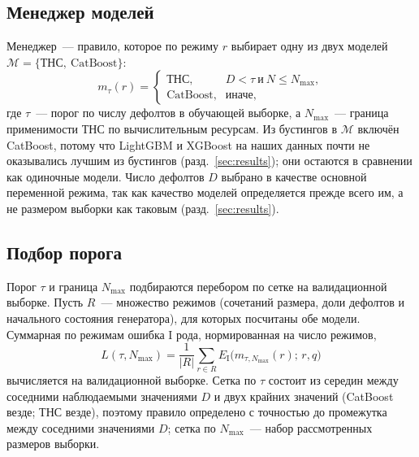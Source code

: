 \documentclass{misisarticle}
\begin{document}
\subsection{Менеджер моделей}

Менеджер~--- правило, которое по режиму $r$ выбирает одну из двух моделей $\mathcal M=\{\text{ТНС},\ \text{CatBoost}\}$:
\begin{equation}
m_\tau(r)=\begin{cases}
\text{ТНС}, & D<\tau\ \text{и}\ N\le N_{\max},\\
\text{CatBoost}, & \text{иначе,}
\end{cases}
\end{equation}
где $\tau$~--- порог по числу дефолтов в обучающей выборке, а $N_{\max}$~--- граница применимости ТНС по вычислительным ресурсам. Из бустингов в $\mathcal M$ включён CatBoost, потому что LightGBM и XGBoost на наших данных почти не оказывались лучшим из бустингов (разд.~\ref{sec:results}); они остаются в сравнении как одиночные модели. Число дефолтов $D$ выбрано в качестве основной переменной режима, так как качество моделей определяется прежде всего им, а не размером выборки как таковым (разд.~\ref{sec:results}).

\subsection{Подбор порога}

Порог $\tau$ и граница $N_{\max}$ подбираются перебором по сетке на валидационной выборке. Пусть $R$~--- множество режимов (сочетаний размера, доли дефолтов и начального состояния генератора), для которых посчитаны обе модели. Суммарная по режимам ошибка I рода, нормированная на число режимов,
\begin{equation}
\label{eq:L}
L(\tau,N_{\max})=\frac{1}{|R|}\sum_{r\in R}E_{\mathrm{I}}\bigl(m_{\tau,N_{\max}}(r);\,r,q\bigr)
\end{equation}
вычисляется на валидационной выборке. Сетка по $\tau$ состоит из середин между соседними наблюдаемыми значениями $D$ и двух крайних значений (CatBoost везде; ТНС везде), поэтому правило определено с точностью до промежутка между соседними значениями $D$; сетка по $N_{\max}$~--- набор рассмотренных размеров выборки.
\end{document}
